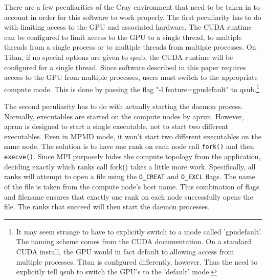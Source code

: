 There are a few peculiarities of the Cray environment that need to be taken in to account in order for this software to work properly.  The first peculiarity has to do with limiting access to the GPU and associated hardware.  The CUDA runtime can be configured to limit access to the GPU to a single thread, to multiple threads from a single process or to multiple threads from multiple processes.  On Titan, if no special options are given to qsub, the CUDA runtime will be configured for a single thread.  Since software described in this paper requires access to the GPU from multiple processes, users must switch to the appropriate compute mode.  This is done by passing the flag "-l feature=gpudefault" to qsub.\footnote{It may seem strange to have to explicitly switch to a mode called 'gpudefault'.  The naming scheme comes from the CUDA documentation.  On a standard CUDA install, the GPU would in fact default to allowing access from multiple processes.  Titan is configured differently, however.  Thus the need to explicitly tell qsub to switch the GPU's to the 'default' mode.}

The second peculiarity has to do with actually starting the daemon process.  Normally, executables are started on the compute nodes by aprun.  However, aprun is designed to start a single executable, not to start two different executables.  Even in MPMD mode, it won't start two different executables on the same node.  The solution is to have one rank on each node call \texttt{fork()} and then \texttt{execve()}.  Since MPI purposely hides the compute topology from the application, deciding exactly which ranks call fork() takes a little more work.  Specifically, all ranks will attempt to open a file using the \texttt{O\_CREAT} and 
\texttt{O\_EXCL} flags.  The name of the file is taken from the compute node's host name.  This combination of flags and filename ensures that exactly one rank on each node successfully opens the file.  The ranks that succeed will then start the daemon processes.

%
%

